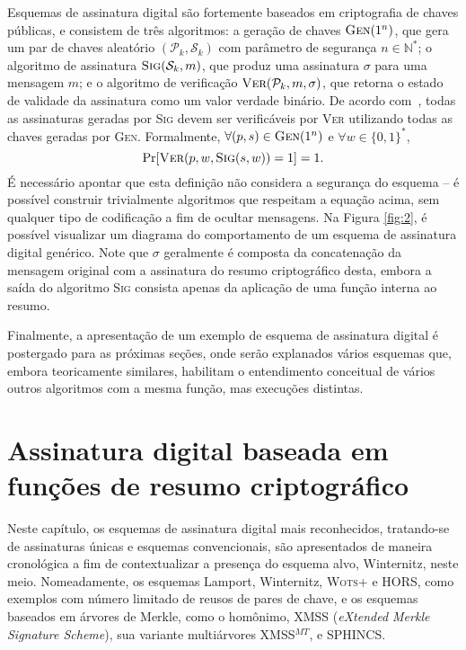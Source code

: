 \documentclass[12pt]{report}
\newcommand{\binwds}[1]{\{0, 1\}^{#1}}
\begin{document}
Esquemas de assinatura digital são fortemente baseados em criptografia de
chaves públicas, e consistem de três algoritmos: a geração de chaves
$\textsc{Gen}(1^n)$, que gera um par de chaves aleatório $(\mathcal{P}_k,
\mathcal{S}_k)$ com parâmetro de segurança $n \in \mathbb{N}^{*}$; o algoritmo
de assinatura $\textsc{Sig}(\mathcal{S}_k, m)$, que produz uma assinatura
$\sigma$ para uma mensagem $m$; e o algoritmo de verificação
$\textsc{Ver}(\mathcal{P}_k, m, \sigma)$, que retorna o estado de validade da
assinatura como um valor verdade binário. De acordo
com~\cite{Goldreich:2004:FCV:975541}, todas as assinaturas geradas por
\textsc{Sig} devem ser verificáveis por \textsc{Ver} utilizando todas as chaves
geradas por \textsc{Gen}. Formalmente, $\forall (p, s) \in \textsc{Gen}(1^n)$ e
$\forall w \in \binwds{*}$,
\begin{equation}
    \text{Pr}[\textsc{Ver}(p, w, \textsc{Sig}(s, w)) = 1] = 1.
\end{equation}
É necessário apontar que esta definição não considera a segurança do esquema --
é possível construir trivialmente algoritmos que respeitam a equação acima, sem
qualquer tipo de codificação a fim de ocultar mensagens.  Na Figura
\ref{fig:2}, é possível visualizar um diagrama do comportamento de um esquema
de assinatura digital genérico. Note que $\sigma$ geralmente é composta da
concatenação da mensagem original com a assinatura do resumo criptográfico
desta, embora a saída do algoritmo \textsc{Sig} consista apenas da aplicação de
uma função interna ao resumo.

Finalmente, a apresentação de um exemplo de esquema de assinatura digital é
postergado para as próximas seções, onde serão explanados vários esquemas que,
embora teoricamente similares, habilitam o entendimento conceitual de vários
outros algoritmos com a mesma função, mas execuções distintas.

\chapter{Assinatura digital baseada em funções de resumo criptográfico}

Neste capítulo, os esquemas de assinatura digital mais reconhecidos,
tratando-se de assinaturas únicas e esquemas convencionais, são apresentados
de maneira cronológica a fim de contextualizar a presença do esquema alvo,
Winternitz, neste meio. Nomeadamente, os esquemas Lamport, Winternitz,
\textsc{Wots+} e HORS, como exemplos com número limitado de reusos de pares
de chave, e os esquemas baseados em árvores de Merkle, como o homônimo, XMSS
(\emph{eXtended Merkle Signature Scheme}), sua variante multiárvores
XMSS$^{MT}$, e SPHINCS.
\end{document}
